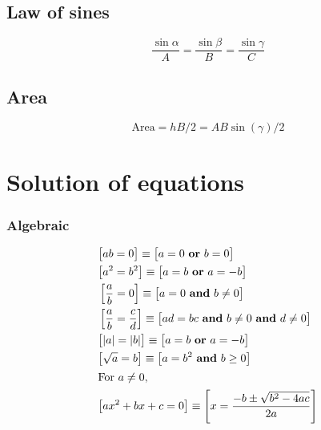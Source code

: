 \documentclass[letterpaper,9pt,fleqn]{extarticle}
\begin{document}
\begin{multicols*}{3}
\subsection*{Law of sines}
\[
    \frac{\sin{\alpha}}{A} =  \frac{\sin{\beta}}{B} =  \frac{\sin{\gamma}}{C}
\]

\subsection*{Area}

\[
    \mbox{Area} = h B / 2=  A B \sin(\gamma) /2
\]


\section*{Solution of equations}
\vspace{-0.2in}
\subsubsection*{Algebraic}
\vspace{-0.2in}
\begin{minipage}[c]{0.1666666666667\textwidth}
\begin{align*}
& \big [a b = 0 \big ] \equiv \big [ a = 0 \mbox{ \textbf{or} } b = 0 \big ]\\
& \big [ a^2 = b^2 \big ] \equiv \big [ a = b \mbox{ \textbf{or} } a = -b \big ]\\
&\left [ \frac{a}{b} = 0 \right ] \equiv \big [ a = 0 \mbox{ \textbf{and} } b \neq 0 \big ] \\
&\left [\frac{a}{b} = \frac{c}{d}  \right ] \equiv \big [ad  = bc \mbox{ \textbf{and}  } b \neq 0  \mbox{ \textbf{and}  }  d \neq 0 \big ] \\
&\big [|a| = |b|  \big ] \equiv \big [a =b \mbox{ \textbf{or} } a = -b \big ]\\
&\big [ \sqrt{a}  = b \big ] \equiv \big [a = b^2 \mbox{ \textbf{and}  } b \ge 0 \big ] \\
\intertext{For \(a \neq 0\),}
& \big [a x^2 + b x + c = 0 \big] \equiv \left [x = \frac{-b \pm \sqrt{b^2 - 4 a c}}{2 a} \right] \\
\end{align*}
\end{minipage}
\vspace{-0.4in}

\end{multicols*}
\end{document}
